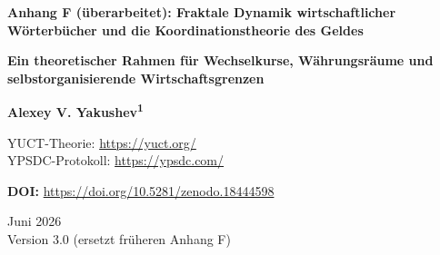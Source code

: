 \documentclass[12pt,a4paper]{article}
\theoremstyle{remark}
\begin{document}
	
	\begin{titlepage}
		\centering
		\vspace*{1cm}
		
		\Huge\textbf{Anhang F (überarbeitet): Fraktale Dynamik wirtschaftlicher Wörterbücher und die Koordinationstheorie des Geldes}
		
		\vspace{0.5cm}
		\Large\textbf{Ein theoretischer Rahmen für Wechselkurse, Währungsräume und selbstorganisierende Wirtschaftsgrenzen}
		
		\vspace{1.5cm}
		
		\Large\textbf{Alexey V. Yakushev\textsuperscript{1}}
		
		YUCT-Theorie: \url{https://yuct.org/}\\
		YPSDC-Protokoll: \url{https://ypsdc.com/}
		
		\vspace{2cm}
		\textbf{DOI:} \url{https://doi.org/10.5281/zenodo.18444598}
		
		\vspace{1cm}
		
		\large
		Juni 2026 \\ \large Version 3.0 (ersetzt früheren Anhang F)
		
		\vspace{2cm}
		

\end{titlepage}
\end{document}
